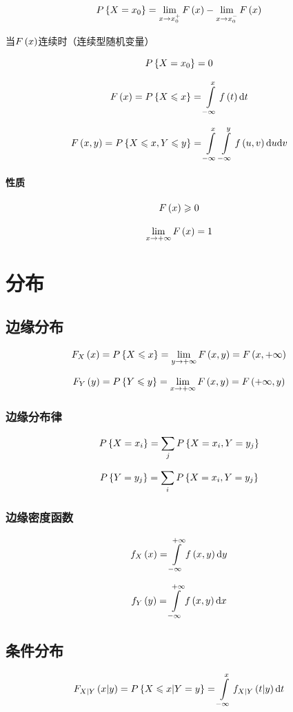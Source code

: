 \documentclass{article}
\begin{document}
\[P\left\{X=x_0\right\}=\lim_{x\to x_0^+}F\left(x\right)-\lim_{x\to x_0^-}F\left(x\right)\]

当$F\left(x\right)$连续时（连续型随机变量）

\[P\left\{X=x_0\right\}=0\]

\[F\left(x\right)=P\left\{X\leqslant x\right\}=\int\limits_{-\infty}^xf\left(t\right)\mathrm d t\]

\[F\left(x,y\right)=P\left\{X\leqslant x,Y\leqslant y\right\}=\int\limits_{-\infty}^x\int\limits_{-\infty}^yf\left(u,v\right)\mathrm d u\mathrm d v\]

\paragraph{性质}

\[F\left(x\right)\geqslant0\]

\[\lim_{x\to+\infty}F\left(x\right)=1\]

\section{分布}

\subsection{边缘分布}

\[F_X\left(x\right)=P\left\{X\leqslant x\right\}=\lim_{y\to+\infty}F\left(x,y\right)=F\left(x,+\infty\right)\]

\[F_Y\left(y\right)=P\left\{Y\leqslant y\right\}=\lim_{x\to+\infty}F\left(x,y\right)=F\left(+\infty,y\right)\]

\subsubsection{边缘分布律}

\[P\left\{X=x_i\right\}=\sum_jP\left\{X=x_i,Y=y_j\right\}\]

\[P\left\{Y=y_j\right\}=\sum_iP\left\{X=x_i,Y=y_j\right\}\]

\subsubsection{边缘密度函数}

\[f_X\left(x\right)=\int\limits_{-\infty}^{+\infty} f\left(x,y\right)\mathrm d y\]

\[f_Y\left(y\right)=\int\limits_{-\infty}^{+\infty} f\left(x,y\right)\mathrm d x\]

\subsection{条件分布}

\[F_{X|Y}\left(x|y\right)=P\left\{X\leqslant x|Y=y\right\}=\int\limits_{-\infty}^x f_{X|Y}\left(t|y\right)\mathrm d t\]
\end{document}
